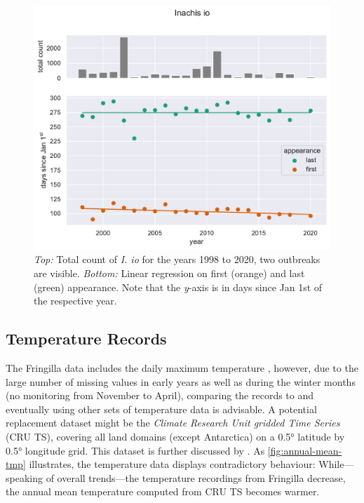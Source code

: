 \begin{figure}
	\centering
	\includegraphics[width=0.9\linewidth]{"figs/Inachis io_linregress"}
	\caption{\textit{Top:} Total count of \textit{I. io} for the years 1998 to 2020, two outbreaks are visible. \textit{Bottom:} Linear regression on first (orange) and last (green) appearance. Note that the \textit{y}-axis is in days since Jan 1st of the respective year.}
	\label{fig:io-linregress}
\end{figure}

\subsection{Temperature Records}

The Fringilla data includes the daily maximum temperature \parencite{shapoval2012}, however, due to the large number of missing values in early years as well as during the winter months (no monitoring from November to April), comparing the records to and eventually using other sets of temperature data is advisable. A potential replacement dataset might be the \textit{Climate Research Unit gridded Time Series} (CRU TS), covering all land domains (except Antarctica) on a \ang{0.5} latitude by \ang{0.5} longitude grid. This dataset is further discussed by \textcite{harris2020}.
As \cref{fig:annual-mean-tmp} illustrates, the temperature data displays contradictory behaviour: While---speaking of overall trends---the temperature recordings from Fringilla decrease, the annual mean temperature computed from CRU TS becomes warmer. 

